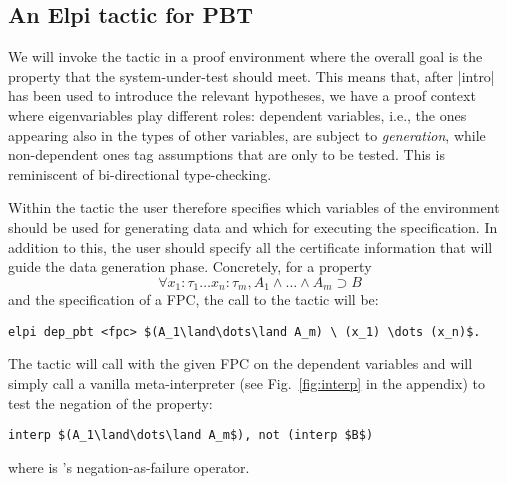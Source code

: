 \subsection{An Elpi tactic for PBT}
\label{ssec:dep_pbt}
We will invoke the tactic in a proof environment where the overall
goal is %
the property that the system-under-test should meet. This means that,
after \lsti|intro| has been used to introduce the relevant hypotheses,
we have a proof
context %
where eigenvariables play different roles: dependent variables, i.e., the ones appearing also in the types of other variables, are
subject to \emph{generation}, while non-dependent ones tag assumptions that
are only to be tested. This is reminiscent of bi-directional
type-checking. %

Within the tactic the user therefore
specifies which variables of the environment should be used for
generating data and which for executing the specification. In addition
to this, the user should specify all the certificate information that
will guide the data generation phase. %
Concretely, for a property
\[
\forall x_1 \colon \tau_1\dots x_n \colon \tau_m, A_1\land\dots\land A_m \supset B
\]
and the specification of a FPC, the call to the tactic will be:
\begin{lstlisting}
elpi dep_pbt <fpc> $(A_1\land\dots\land A_m) \ (x_1) \dots (x_n)$.
\end{lstlisting}
The tactic will call  with the given FPC on the dependent variables and will simply call a vanilla meta-interpreter (see Fig.~\ref{fig:interp} in the appendix) to test the negation of the property:
\begin{lstlisting}
interp $(A_1\land\dots\land A_m$), not (interp $B$)
\end{lstlisting}
where  is \lP's negation-as-failure operator.

